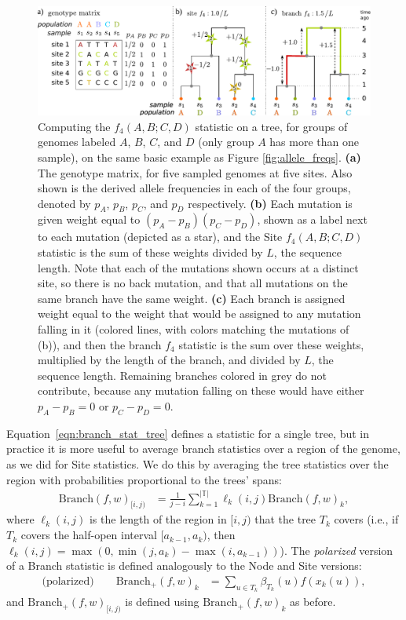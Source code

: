 \documentclass{article}
\newcommand{\branch}{\mbox{Branch}} %
\newcommand{\branchp}{\mbox{Branch}_+} %
\newcommand{\treeseq}{\mathbb{T}} %
\newcommand{\iw}{w} %
\newcommand{\nw}{x} %
\begin{document}
\begin{figure}
    \centering
    \includegraphics{figures/branch_site_diagram}
    \caption{
    Computing the $f_4(A,B;C,D)$ statistic on a tree,
    for groups of genomes labeled $A$, $B$, $C$, and $D$
    (only group $A$ has more than one sample),
    on the same basic example as Figure \ref{fig:allele_freqs}.
    \textbf{(a)} The genotype matrix, for five sampled genomes at five sites.
    Also shown is the derived allele frequencies in each of the four groups,
    denoted by $p_A$, $p_B$, $p_C$, and $p_D$ respectively.
    \textbf{(b)} Each mutation is given weight equal to $(p_A - p_B)(p_C - p_D)$,
    shown as a label next to each mutation (depicted as a star),
    and the Site $f_4(A,B;C,D)$ statistic is the sum of these weights
    divided by $L$, the sequence length.
    Note that each of the mutations shown occurs at a distinct site, so there is no back mutation,
    and that all mutations on the same branch have the same weight.
    \textbf{(c)} Each branch is assigned weight equal to the weight that would be assigned
    to any mutation falling in it (colored lines, with colors matching the mutations of (b)),
    and then the branch $f_4$ statistic
    is the sum over these weights, multiplied by the length of the branch,
    and divided by $L$, the sequence length.
    Remaining branches colored in grey do not contribute,
    because any mutation falling on these would have either $p_A - p_B = 0$ or $p_C - p_D = 0$.
        \label{fig:branch_site_diagram}
    }
\end{figure}

Equation~\eqref{eqn:branch_stat_tree} defines a statistic for a single tree,
but in practice it is more useful to average branch statistics
over a region of the genome, as we did for Site statistics.
We do this by averaging the tree statistics over the region
with probabilities proportional to the trees' spans:
\begin{align}
    \branch(f, \iw)_{[i,j)}
    &=
    \frac{1}{j-i} \sum_{k=1}^{|\treeseq|} \ell_k(i,j) \branch(f, \iw)_{k} ,
\end{align}
where $\ell_k(i,j)$ is the length of the region in $[i,j)$ that the tree $T_k$ covers
(i.e., if $T_k$ covers the half-open interval $[a_{k-1},a_k)$,
then $\ell_k(i,j) = \max(0, \min(j,a_k) - \max(i,a_{k-1}))$).
The \emph{polarized} version of a Branch statistic
is defined analogously to the Node and Site versions:
\begin{align} \label{eqn:branch_polarised}
    \text{(polarized)} \qquad
    \branchp(f, \iw)_k
    &=
    \sum_{u \in T_k} \beta_{T_k}(u) f(\nw_{k}(u)) ,
\end{align}
and $\branchp(f, \iw)_{[i,j)}$ is defined using $\branchp(f, \iw)_k$ as before.
\end{document}

